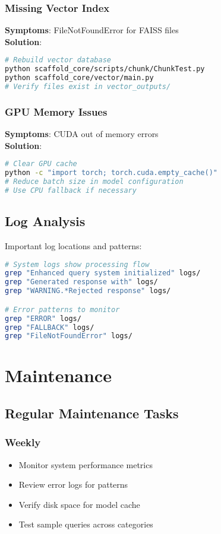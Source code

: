 \documentclass[12pt,a4paper]{article}
\begin{document}
\subsubsection{Missing Vector Index}
\textbf{Symptoms}: FileNotFoundError for FAISS files \\
\textbf{Solution}:
\begin{lstlisting}[language=bash]
# Rebuild vector database
python scaffold_core/scripts/chunk/ChunkTest.py
python scaffold_core/vector/main.py
# Verify files exist in vector_outputs/
\end{lstlisting}

\subsubsection{GPU Memory Issues}
\textbf{Symptoms}: CUDA out of memory errors \\
\textbf{Solution}:
\begin{lstlisting}[language=bash]
# Clear GPU cache
python -c "import torch; torch.cuda.empty_cache()"
# Reduce batch size in model configuration
# Use CPU fallback if necessary
\end{lstlisting}

\subsection{Log Analysis}
Important log locations and patterns:

\begin{lstlisting}[language=bash]
# System logs show processing flow
grep "Enhanced query system initialized" logs/
grep "Generated response with" logs/
grep "WARNING.*Rejected response" logs/

# Error patterns to monitor
grep "ERROR" logs/
grep "FALLBACK" logs/
grep "FileNotFoundError" logs/
\end{lstlisting}

\section{Maintenance}

\subsection{Regular Maintenance Tasks}

\subsubsection{Weekly}
\begin{itemize}
    \item Monitor system performance metrics
    \item Review error logs for patterns
    \item Verify disk space for model cache
    \item Test sample queries across categories
\end{itemize}
\end{document}
